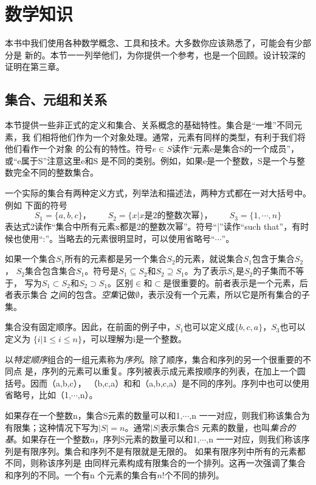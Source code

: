 \section{数学知识}
本书中我们使用各种数学概念、工具和技术。大多数你应该熟悉了，可能会有少部分是
新的。本节一一列举他们，为你提供一个参考，也是一个回顾。设计较深的证明在第三章。

\subsection{集合、元组和关系}\label{Sec:SetTupleRelation}
本节提供一些非正式的定义和集合、关系概念的基础特性。集合是“一堆”不同元素，我
们相将他们作为一个对象处理。通常，元素有同样的类型，有利于我们将他们看作一个对象
的公有的特性。符号$e\in
S$读作“元素e是集合S的一个成员”，或“e属于S”注意这里e和S
是不同的类别。例如，如果e是一个整数，S是一个与整数完全不同的整数集合。

一个实际的集合有两种定义方式，列举法和描述法，两种方式都在一对大括号中。例如
下面的符号
\begin{displaymath}
    S_1=\{a,b,c\}，\qquad S_2=\{x|x \mbox{是2的整数次幂} \}，\qquad
    S_3=\{1,\cdots,n\}
\end{displaymath}
表达式2读作“集合中所有元素x都是2的整数次幂”。符号“|”读作“such
that”，有时候也使用“:”。当略去的元素很明显时，可以使用省略号“$\cdots$”。

如果一个集合$S_1$所有的元素都是另一个集合$S_2$的元素，就说集合$S_1$包含于集合$S_2$，
$S_2$集合包含集合$S_1$。符号是$S_1 \subseteq S_2$和$S_2 \supseteq
S_1$。为了表示$S_1$是$S_2$的子集而不等于， 写为$S_1\subset
S_2$和$S_2\supset
S_1$。区别$\in$和$\subset$是很重要的。前者表示是一个元素，后者表示集合
之间的包含。\emph{空集}记做$\emptyset$，表示没有一个元素，所以它是所有集合的子集。


集合没有固定顺序。因此，在前面的例子中，$S_1$也可以定义成$\{b, c,
a\}$，$S_3$也可以定义为 $\{i|1\leq i \leq
n\}$，可以理解为i是一个整数。

以\emph{特定顺序}组合的一组元素称为\emph{序列}。除了顺序，集合和序列的另一个很重要的不同点
是，序列的元素可以重复。序列被表示成元素按顺序的列表，在加上一个圆括号。因而（a,b,c），
（b,c,a）和和（a,b,c,a）是不同的序列。序列中也可以使用省略号，比如（1,$\cdots$,n）。

如果存在一个整数n，集合S元素的数量可以和{1,$\cdots$,n}
一一对应，则我们称该集合为有限集；这种情况下写为$|S|=n$。通常$|S|$表示集合S
元素的数量，也叫\emph{集合的基}。如果存在一个整数n，序列S元素的数量可以和{1,$\cdots$,n}
一一对应，则我们称该序列是有限序列。集合和序列不是有限就是无限的。
如果有限序列中所有的元素都不同，则称该序列是
由同样元素构成有限集合的一个排列。这再一次强调了集合和序列的不同。一个有n
个元素的集合有$n!$个不同的排列。

